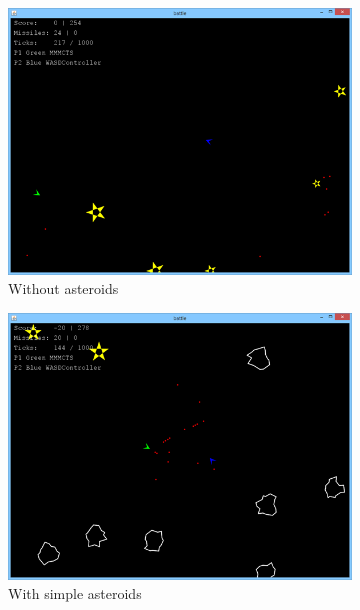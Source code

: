\begin{figure}
	\caption{Screenshots from the three game modes.}
	\begin{subfigure}[b]{0.3\textwidth}
		\center
		\includegraphics[scale=0.33]{resources/gamemode2}
		\caption{Without asteroids}
	\end{subfigure}
	\begin{subfigure}[b]{0.3\textwidth}
		\center
		\includegraphics[scale=0.33]{resources/gamemode1}
		\caption{With simple asteroids}
	\end{subfigure}
	\begin{subfigure}[b]{0.3\textwidth}
		\center

\end{subfigure}
\end{figure}

